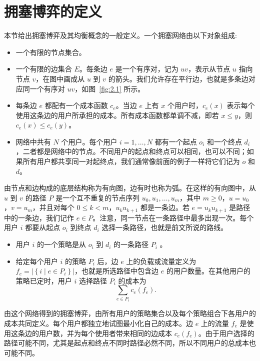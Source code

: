 \section{拥塞博弈的定义}\label{sec-2.4}

本节给出拥塞博弈及其均衡概念的一般定义。一个拥塞网络由以下对象组成:
\begin{itemize}
\item 一个有限的节点集合。
\item 一个有限的边集合 \(E\)。每条边 \(e\) 是一个有序对，记为 \({uv}\)，表示从节点 \(u\) 指向节点 \(v\)，在图中画成从 \(u\) 到 \(v\) 的箭头。我们允许存在平行边，也就是多条边对应同一个有序对 \({uv}\)，如图~\ref{fig:2.1} 所示。
\item 每条边 \(e\) 都配有一个成本函数 \({c}_{e}\)。当边 \(e\) 上有 \(x\) 个用户时，\({c}_{e}\left( x\right)\) 表示每个使用这条边的用户所承担的成本。所有成本函数都单调不减，即若 \(x \leq  y\)，则 \({c}_{e}\left( x\right)  \leq  {c}_{e}\left( y\right)\)。
\item 网络中共有 \(N\) 个用户。每个用户 \(i = 1,\ldots ,N\) 都有一个起点 \({o}_{i}\) 和一个终点 \({d}_{i}\)，二者都是网络中的节点。不同用户的起点和终点可以相同，也可以不同；如果所有用户都共享同一对起终点，我们通常像前面的例子一样将它们记为 \(o\) 和 \(d\)。
\end{itemize}
由节点和边构成的底层结构称为有向图，边有时也称为弧。在这样的有向图中，从 \(u\) 到 \(v\) 的路径 \(P\) 是一个互不重复的节点序列 \({u}_{0},{u}_{1},\ldots ,{u}_{m}\)，其中 \(m \geq 0\)，\(u = {u}_{0}\)，\(v = {u}_{m}\)，并且对每个 \(0 \leq k < m\)，\({u}_{k}{u}_{k + 1}\) 都是一条边。若 \(e = {u}_{k}{u}_{k + 1}\) 是路径中的一条边，我们记作 \(e \in P\)。注意，同一节点在一条路径中最多出现一次。每个用户 \(i\) 都要从起点 \({o}_{i}\) 到终点 \({d}_{i}\) 选择一条路径，也就是前文所说的路线。
\begin{itemize}
\item 用户 \(i\) 的一个策略是从 \({o}_{i}\) 到 \({d}_{i}\) 的一条路径 \({P}_{i}\) 。
\item 给定每个用户 \(i\) 的策略 \({P}_{i}\) 后，边 \(e\) 上的负载或流量定义为 \({f}_{e} = \left| \left\{  {i \mid  e \in  {P}_{i}}\right\}  \right|\)，也就是所选路径中包含边 \(e\) 的用户数量。在其他用户的策略已定时，用户 \(i\) 选择路径 \({P}_{i}\) 的成本为\begin{equation}\label{eq:2.1}
\sum_{{e \in  {P}_{i}}}{c}_{e}\left( {f}_{e}\right).
\end{equation}
\end{itemize}
由这个网络得到的拥塞博弈，由所有用户的策略集合以及每个策略组合下各用户的成本共同定义。每个用户都独立地试图最小化自己的成本。边 \(e\) 上的流量 \({f}_{e}\) 是使用这条边的用户数，并为每个使用者带来相同的边成本 \({c}_{e}\left( {f}_{e}\right)\)。由于用户选择的路径可能不同，尤其是起点和终点不同时路径必然不同，所以不同用户的总成本也可能不同。

